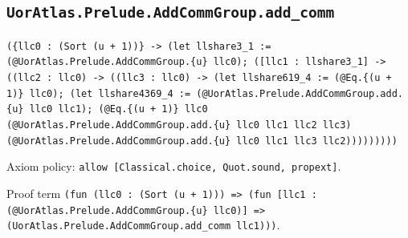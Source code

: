 \documentclass[11pt]{article}
\begin{document}
\subsection*{\texttt{UorAtlas.Prelude.AddCommGroup.add\_comm}}
\noindent\texttt{(\{llc0 : (Sort (u + 1))\} -> (let llshare3\_1 := (@UorAtlas.Prelude.AddCommGroup.\{u\} llc0); ([llc1 : llshare3\_1] -> ((llc2 : llc0) -> ((llc3 : llc0) -> (let llshare619\_4 := (@Eq.\{(u + 1)\} llc0); (let llshare4369\_4 := (@UorAtlas.Prelude.AddCommGroup.add.\{u\} llc0 llc1); (@Eq.\{(u + 1)\} llc0 (@UorAtlas.Prelude.AddCommGroup.add.\{u\} llc0 llc1 llc2 llc3) (@UorAtlas.Prelude.AddCommGroup.add.\{u\} llc0 llc1 llc3 llc2)))))))))}\par
\noindent Axiom policy: \texttt{allow [Classical.choice, Quot.sound, propext]}.\par
\noindent Proof term \texttt{(fun (llc0 : (Sort (u + 1))) => (fun [llc1 : (@UorAtlas.Prelude.AddCommGroup.\{u\} llc0)] => (UorAtlas.Prelude.AddCommGroup.add\_comm llc1)))}.\par
\end{document}
